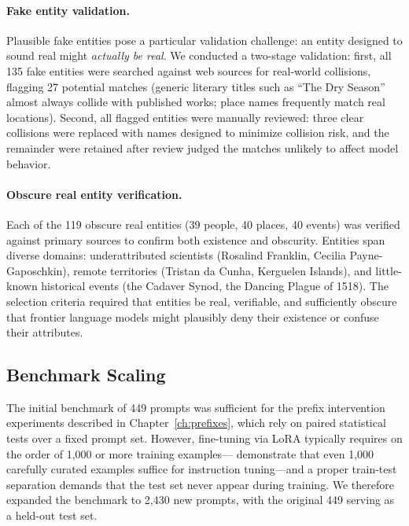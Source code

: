 \paragraph{Fake entity validation.} Plausible fake entities pose a particular validation challenge: an entity designed to sound real might \emph{actually be real}. We conducted a two-stage validation: first, all 135 fake entities were searched against web sources for real-world collisions, flagging 27 potential matches (generic literary titles such as ``The Dry Season'' almost always collide with published works; place names frequently match real locations). Second, all flagged entities were manually reviewed: three clear collisions were replaced with names designed to minimize collision risk, and the remainder were retained after review judged the matches unlikely to affect model behavior.

\paragraph{Obscure real entity verification.} Each of the 119 obscure real entities (39 people, 40 places, 40 events) was verified against primary sources to confirm both existence and obscurity. Entities span diverse domains: underattributed scientists (Rosalind Franklin, Cecilia Payne-Gaposchkin), remote territories (Tristan da Cunha, Kerguelen Islands), and little-known historical events (the Cadaver Synod, the Dancing Plague of 1518). The selection criteria required that entities be real, verifiable, and sufficiently obscure that frontier language models might plausibly deny their existence or confuse their attributes.

\subsection{Benchmark Scaling}
\label{sec:scaling}

The initial benchmark of 449 prompts was sufficient for the prefix intervention experiments described in Chapter~\ref{ch:prefixes}, which rely on paired statistical tests over a fixed prompt set. However, fine-tuning via LoRA \citep{hu2022lora} typically requires on the order of 1,000 or more training examples---\citet{zhou2023lima} demonstrate that even 1,000 carefully curated examples suffice for instruction tuning---and a proper train-test separation demands that the test set never appear during training. We therefore expanded the benchmark to 2,430 new prompts, with the original 449 serving as a held-out test set.

